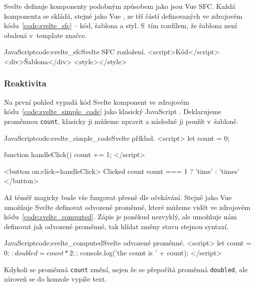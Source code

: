 \documentclass[
  master,
  program=ainf,
  tables=false,
  sourcecodes,
  glossaries,
  index
]{kidiplom}
\begin{document}
Svelte \cite{svelte} definuje komponenty podobným způsobem jako jsou Vue SFC. Každá komponenta se skládá,
stejně jako Vue \cite{vue}, ze tří částí definovaných ve zdrojovém kódu~\ref{code:svelte_sfc} -- kód, šablona a styl.
S~tím rozdílem, že šablona není obalená v~template značce.

\begin{absolutelynopagebreak}
\begin{kicode}{JavaScript}{code:svelte_sfc}{Svelte SFC rozložení.}
  <script>Kód</script>
  <div>Šablona</div>
  <style></style>
\end{kicode}
\end{absolutelynopagebreak}

\subsubsection{Reaktivita}

Na první pohled vypadá kód Svelte komponent ve zdrojovém kódu~\ref{code:svelte_simple_code} jako klasický JavaScript \cite{js}. Deklarujeme proměnnou {\tt count},
klasicky ji můžeme upravit a následně ji použít v~šabloně.

\begin{kicode}{JavaScript}{code:svelte_simple_code}{Svelte příklad.}
  <script>
    let count = 0;

    function handleClick() {
      count += 1;
    }
  </script>

  <button on:click={handleClick}>
    Clicked {count} {count === 1 ? 'time' : 'times'}
  </button>
\end{kicode}

Až téměř magicky bude vše fungovat přesně dle očekávání. Stejně jako Vue \cite{vue} umožňuje Svelte \cite{svelte} definovat
odvozené proměnné, které můžeme vidět ve zdrojovém kódu~\ref{code:svelte_computed}. Zápis je poněkud nezvyklý, ale umožňuje nám definovat jak odvozené proměnné, tak
hlídat změny stavu stejnou syntaxí. 

  \begin{kicode}{JavaScript}{code:svelte_computed}{Svelte odvozené proměnné.}
    <script>
      let count = 0;
      $: doubled = count * 2;

      $: {
        console.log('the count is ' + count);
      }
    </script>
  \end{kicode}

Kdykoli se proměnná {\tt count} změní, nejen že se přepočítá proměnná {\tt doubled}, ale zároveň se do konzole
vypíše text.
\end{document}
